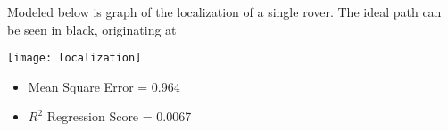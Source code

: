 Modeled below is graph of the localization of a single rover. The ideal path can be seen in black, originating at 

\texttt{[image: localization]}

\begin{itemize}
	\item Mean Square Error = 0.964 
	\item $R^2$ Regression Score = 0.0067
\end{itemize}

